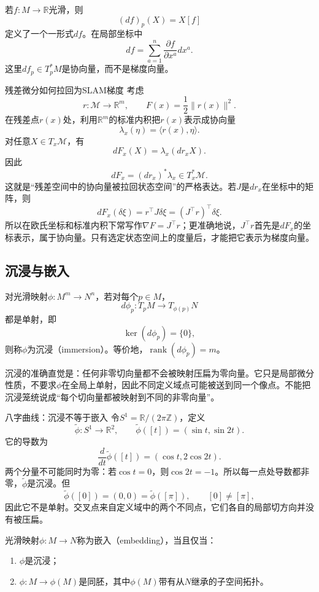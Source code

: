 若$f:M\to\mathbb R$光滑，则
\[
    (df)_p(X)=X[f]
\]
定义了一个一形式$df$。在局部坐标中
\[
    df=\sum_{a=1}^{n}\frac{\partial f}{\partial x^a}dx^a.
\]
这里$df_p\in T_p^\ast M$是协向量，而不是梯度向量。

\begin{slamcase}{残差微分如何拉回为SLAM梯度}
考虑
\[
    r:\mathcal M\to\mathbb R^m,
    \qquad
    F(x)=\frac12\|r(x)\|^2.
\]
在残差点$r(x)$处，利用$\mathbb R^m$的标准内积把$r(x)$表示成协向量
\[
    \lambda_x(\eta)=\langle r(x),\eta\rangle.
\]
对任意$X\in T_x\mathcal M$，有
\[
    dF_x(X)=\lambda_x(dr_xX).
\]
因此
\[
    dF_x=(dr_x)^\ast\lambda_x\in T_x^\ast\mathcal M.
\]
这就是“残差空间中的协向量被拉回状态空间”的严格表达。若$J$是$dr_x$在坐标中的矩阵，则
\[
    dF_x(\delta\xi)
    =r^\top J\delta\xi
    =(J^\top r)^\top\delta\xi.
\]
所以在欧氏坐标和标准内积下常写作$\nabla F=J^\top r$；更准确地说，$J^\top r$首先是$dF_x$的坐标表示，属于协向量。只有选定状态空间上的度量后，才能把它表示为梯度向量。
\end{slamcase}

\subsection{沉浸与嵌入}

\begin{definition}[沉浸]
对光滑映射$\phi:M^m\to N^n$，若对每个$p\in M$，
\[
    d\phi_p:T_pM\to T_{\phi(p)}N
\]
都是单射，即
\[
    \ker(d\phi_p)=\{0\},
\]
则称$\phi$为沉浸（immersion）。等价地，$\operatorname{rank}(d\phi_p)=m$。
\end{definition}

沉浸的准确直觉是：任何非零切向量都不会被映射压扁为零向量。它只是局部微分性质，不要求$\phi$在全局上单射，因此不同定义域点可能被送到同一个像点。不能把沉浸笼统说成“每个切向量都被映射到不同的非零向量”。

\begin{slamcase}{八字曲线：沉浸不等于嵌入}
令$S^1=\mathbb R/(2\pi\mathbb Z)$，定义
\[
    \widetilde\phi:S^1\to\mathbb R^2,
    \qquad
    \widetilde\phi([t])=(\sin t,\sin 2t).
\]
它的导数为
\[
    \frac{d}{dt}\widetilde\phi([t])=(\cos t,2\cos2t).
\]
两个分量不可能同时为零：若$\cos t=0$，则$\cos2t=-1$。所以每一点处导数都非零，$\widetilde\phi$是沉浸。但
\[
    \widetilde\phi([0])=(0,0)=\widetilde\phi([\pi]),
    \qquad [0]\neq[\pi],
\]
因此它不是单射。交叉点来自定义域中的两个不同点，它们各自的局部切方向并没有被压扁。
\end{slamcase}

\begin{definition}[嵌入]
光滑映射$\phi:M\to N$称为嵌入（embedding），当且仅当：
\begin{enumerate}
    \item $\phi$是沉浸；
    \item $\phi:M\to\phi(M)$是同胚，其中$\phi(M)$带有从$N$继承的子空间拓扑。
\end{enumerate}
\end{definition}

